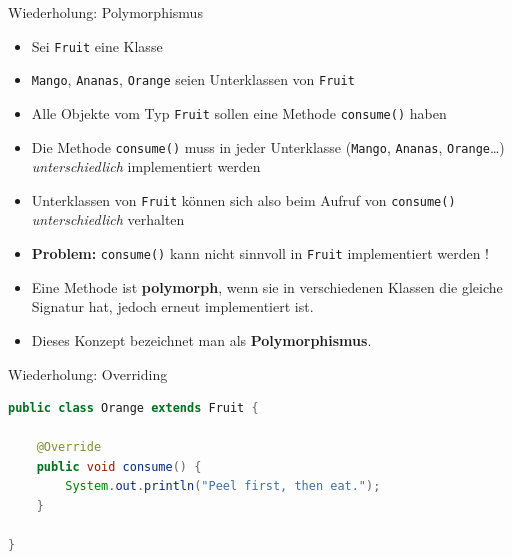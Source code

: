 \documentclass[18pt]{beamer}
\begin{document}
\begin{frame}{Wiederholung: Polymorphismus}

    \begin{itemize}
        \item Sei \texttt{Fruit} eine Klasse
        \item \texttt{Mango}, \texttt{Ananas}, \texttt{Orange} seien Unterklassen von \texttt{Fruit}
        \item Alle Objekte vom Typ \texttt{Fruit} sollen eine Methode \texttt{consume()} haben
        \item Die Methode \texttt{consume()} muss in jeder Unterklasse (\texttt{Mango}, \texttt{Ananas}, \texttt{Orange}\dots) \textit{unterschiedlich} implementiert werden
        \item Unterklassen von \texttt{Fruit} können sich also beim Aufruf von \texttt{consume()} \textit{unterschiedlich} verhalten
        \item \textbf{Problem:} \texttt{consume()} kann nicht sinnvoll in \texttt{Fruit} implementiert werden !
    \end{itemize}

    \begin{block}{}
        \begin{itemize}
            \item Eine Methode ist \textbf{polymorph}, wenn sie in verschiedenen Klassen die gleiche Signatur hat, jedoch erneut implementiert ist.
            \item Dieses Konzept bezeichnet man als \textbf{Polymorphismus}.
        \end{itemize}
    \end{block}

\end{frame}

\begin{frame}[fragile]{Wiederholung: Overriding}
    \begin{exampleblock}{}
        \begin{lstlisting}[language=Java,basicstyle=\scriptsize]
public class Orange extends Fruit {

    @Override
    public void consume() {
        System.out.println("Peel first, then eat.");
    }

}
        \end{lstlisting}

    \end{exampleblock}

\end{frame}
\end{document}
